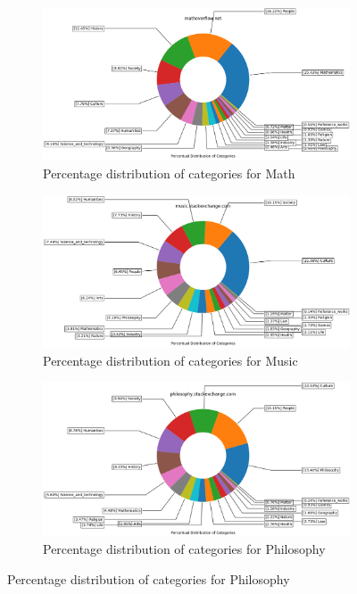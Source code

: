  
\begin{figure}[H]
\ContinuedFloat

    \begin{subfigure}{0.9\textwidth}
    \centering
        \includegraphics[width=1\linewidth]{imgs/percentual-distribution/mathoverflow_net_donut}
        \caption{Percentage distribution of categories for Math}
        \label{fig:percentage-distribution-math}
    \end{subfigure}%
    
    \begin{subfigure}{0.9\textwidth}
    \centering
        \includegraphics[width=1\linewidth]{imgs/percentual-distribution/music_stackexchange_com_donut}
        \caption{Percentage distribution of categories for Music}
        \label{fig:percentage-distribution-music}
    \end{subfigure}
 
     \begin{subfigure}{0.9\textwidth}
    \centering
        \includegraphics[width=1\linewidth]{imgs/percentual-distribution/philosophy_stackexchange_com_donut}
        \caption{Percentage distribution of categories for Philosophy}
        \label{fig:percentage-distribution-philosophy}
    \end{subfigure}%
 

\end{figure}
